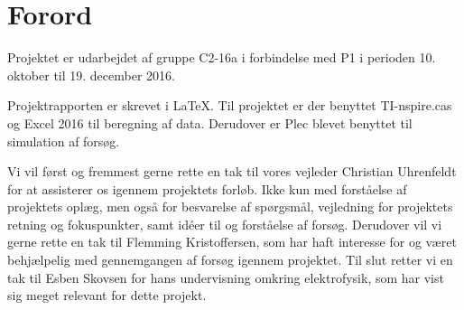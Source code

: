 \chapter{Forord}
Projektet er udarbejdet af gruppe C2-16a i forbindelse med P1 i perioden 10. oktober til 19. december 2016.

Projektrapporten er skrevet i \LaTeX. Til projektet er der benyttet TI-nspire.cas og Excel 2016 til beregning af data. Derudover er Plec blevet benyttet til simulation af forsøg.

Vi vil først og fremmest gerne rette en tak til vores vejleder Christian Uhrenfeldt for at assisterer os igennem projektets forløb. Ikke kun med forståelse af projektets oplæg, men også for besvarelse af spørgsmål, vejledning for projektets retning og fokuspunkter, samt idéer til og forståelse af forsøg. Derudover vil vi gerne rette en tak til Flemming Kristoffersen, som har haft interesse for og været behjælpelig med gennemgangen af forsøg igennem projektet. Til slut retter vi en tak til Esben Skovsen for hans undervisning omkring elektrofysik, som har vist sig meget relevant for dette projekt.
